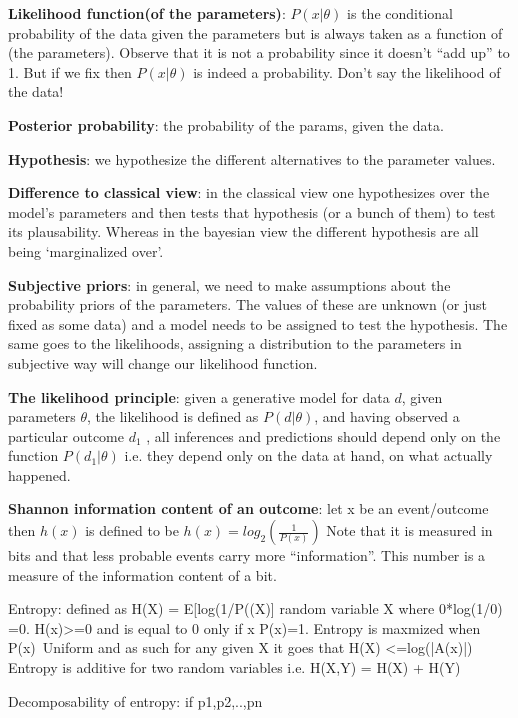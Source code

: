 \textbf{Likelihood function(of the parameters)}: $P(x|\theta)$ is the conditional probability of the data given the parameters but is always taken as a function of \theta (the parameters). Observe that it is not a probability since it doesn't “add up” to 1. But if we fix \theta then $P(x|\theta)$ is indeed a probability. 
Don’t say the likelihood of the data!

\textbf{Posterior probability}: the probability of the params, given the data.

\textbf{Hypothesis}: we hypothesize the different alternatives to the parameter values. 

\textbf{Difference to classical view}: in the classical view one hypothesizes over the model’s parameters and then tests that hypothesis (or a bunch of them) to test its plausability. Whereas in the bayesian view the different hypothesis are all being ‘marginalized over’.

\textbf{Subjective priors}: in general, we need to make assumptions about the probability priors of the parameters. The values of these are unknown (or just fixed as some data) and a model needs to be assigned to test the hypothesis. The same goes to the likelihoods, assigning a distribution to the parameters in subjective way will change our likelihood function.

\textbf{The likelihood principle}: given a generative model for data $d$, given parameters $\theta$, the likelihood is defined as $P (d | \theta)$, and having observed a particular outcome $d_1$ , all inferences and predictions should depend only on the function $P(d_1 | \theta)$ i.e. they depend only on the data at hand, on what actually happened. 

\textbf{Shannon information content of an outcome}: let x be an event/outcome then $h(x)$ is defined to be 
$h(x) = log _2(\frac{1}{ P(x)})$
Note that it is measured in bits and that less probable events carry more “information”.
This number is a measure of the information content of a bit. 

Entropy: defined as H(X) =  E[log(1/P((X)] random variable X where 0*log(1/0) =0. H(x)>=0 and is equal to 0 only if x P(x)=1. 
Entropy is maxmized when P(x)~Uniform and as such for any given X it goes that H(X) <=log(|A(x)|)
Entropy is additive for two random variables i.e. H(X,Y) = H(X) + H(Y)

Decomposability of entropy:  if {p1,p2,..,pn}


